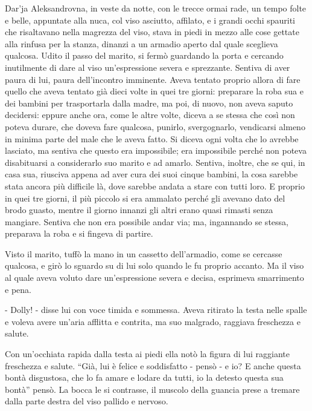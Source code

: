 \label{iv} 

Dar'ja Aleksandrovna, in veste da notte, con le trecce ormai rade, un tempo folte e belle, appuntate alla nuca, col viso asciutto, affilato, e i grandi occhi spauriti che risaltavano nella magrezza del viso, stava in piedi in mezzo alle cose gettate alla rinfusa per la stanza, dinanzi a un armadio aperto dal quale sceglieva qualcosa. Udito il passo del marito, si fermò guardando la porta e cercando inutilmente di dare al viso un'espressione severa e sprezzante. Sentiva di aver paura di lui, paura dell'incontro imminente. Aveva tentato proprio allora di fare quello che aveva tentato già dieci volte in quei tre giorni: preparare la roba sua e dei bambini per trasportarla dalla madre, ma poi, di nuovo, non aveva saputo decidersi: eppure anche ora, come le altre volte, diceva a se stessa che così non poteva durare, che doveva fare qualcosa, punirlo, svergognarlo, vendicarsi almeno in minima parte del male che le aveva fatto. Si diceva ogni volta che lo avrebbe lasciato, ma sentiva che questo era impossibile; era impossibile perché non poteva disabituarsi a considerarlo suo marito e ad amarlo. Sentiva, inoltre, che se qui, in casa sua, riusciva appena ad aver cura dei suoi cinque bambini, la cosa sarebbe stata ancora più difficile là, dove sarebbe andata a stare con tutti loro. E proprio in quei tre giorni, il più piccolo si era ammalato perché gli avevano dato del brodo guasto, mentre il giorno innanzi gli altri erano quasi rimasti senza mangiare. Sentiva che non era possibile andar via; ma, ingannando se stessa, preparava la roba e si fingeva di partire. 

Visto il marito, tuffò la mano in un cassetto dell'armadio, come se cercasse qualcosa, e girò lo sguardo su di lui solo quando le fu proprio accanto. Ma il viso al quale aveva voluto dare un'espressione severa e decisa, esprimeva smarrimento e pena. 

- Dolly! - disse lui con voce timida e sommessa. Aveva ritirato la testa nelle spalle e voleva avere un'aria afflitta e contrita, ma suo malgrado, raggiava freschezza e salute. 

Con un'occhiata rapida dalla testa ai piedi ella notò la figura di lui raggiante freschezza e salute. ``Già, lui è felice e soddisfatto - pensò - e io? E anche questa bontà disgustosa, che lo fa amare e lodare da tutti, io la detesto questa sua bontà'' pensò. La bocca le si contrasse, il muscolo della guancia prese a tremare dalla parte destra del viso pallido e nervoso. 

